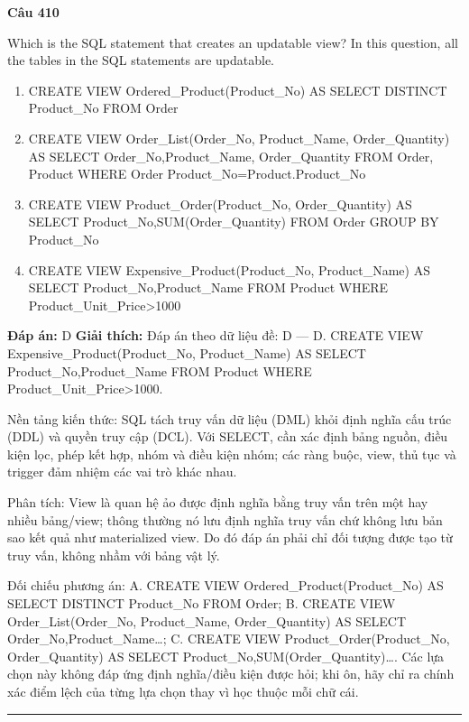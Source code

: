 \documentclass[11pt,a4paper]{article}
\newenvironment{question}[1]{%
  \par\vspace{1em}\noindent\textbf{\large Câu #1}\par\vspace{0.4em}
}{%
  \par\vspace{1em}\hrule\vspace{0.6em}
}
\newenvironment{choices}{%
  \begin{enumerate}[label=\textbf{\Alph*.},leftmargin=2.2em,itemsep=2pt,topsep=3pt]
}{%
  \end{enumerate}
}
\newcommand{\choice}{\item}
\begin{document}
\begin{question}{410}
Which is the SQL statement that creates an updatable view? In this question, all the tables in the SQL
statements are updatable.
\begin{choices}
\choice CREATE VIEW Ordered_Product(Product_No) AS SELECT DISTINCT Product_No FROM Order
\choice CREATE VIEW Order_List(Order_No, Product_Name, Order_Quantity) AS SELECT Order_No,Product_Name, Order_Quantity FROM Order, Product WHERE Order Product_No=Product.Product_No
\choice CREATE VIEW Product_Order(Product_No, Order_Quantity) AS SELECT Product_No,SUM(Order_Quantity) FROM Order GROUP BY Product_No
\choice CREATE VIEW Expensive_Product(Product_No, Product_Name) AS SELECT Product_No,Product_Name FROM Product WHERE Product_Unit_Price>1000
\end{choices}
\textbf{Đáp án:} D
\textbf{Giải thích:} Đáp án theo dữ liệu đề: D — D. CREATE VIEW Expensive_Product(Product_No, Product_Name) AS SELECT Product_No,Product_Name FROM Product WHERE Product_Unit_Price>1000.

Nền tảng kiến thức: SQL tách truy vấn dữ liệu (DML) khỏi định nghĩa cấu trúc (DDL) và quyền truy cập (DCL). Với SELECT, cần xác định bảng nguồn, điều kiện lọc, phép kết hợp, nhóm và điều kiện nhóm; các ràng buộc, view, thủ tục và trigger đảm nhiệm các vai trò khác nhau.

Phân tích: View là quan hệ ảo được định nghĩa bằng truy vấn trên một hay nhiều bảng/view; thông thường nó lưu định nghĩa truy vấn chứ không lưu bản sao kết quả như materialized view. Do đó đáp án phải chỉ đối tượng được tạo từ truy vấn, không nhầm với bảng vật lý.

Đối chiếu phương án: A. CREATE VIEW Ordered_Product(Product_No) AS SELECT DISTINCT Product_No FROM Order; B. CREATE VIEW Order_List(Order_No, Product_Name, Order_Quantity) AS SELECT Order_No,Product_Name…; C. CREATE VIEW Product_Order(Product_No, Order_Quantity) AS SELECT Product_No,SUM(Order_Quantity)…. Các lựa chọn này không đáp ứng định nghĩa/điều kiện được hỏi; khi ôn, hãy chỉ ra chính xác điểm lệch của từng lựa chọn thay vì học thuộc mỗi chữ cái.
\end{question}
\end{document}
